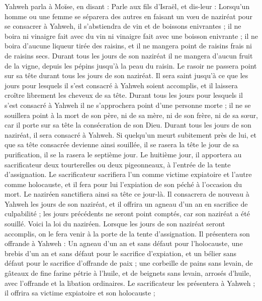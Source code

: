 \begin{multicols}{2}
\VerseOne{}Yahweh parla à Moïse, en disant :
Parle aux fils d'Israël, et dis-leur : Lorsqu’un homme ou une femme se séparera des autres en faisant un vœu de naziréat pour se consacrer à Yahweh,
il s'abstiendra de vin et de boissons enivrantes ; il ne boira ni vinaigre fait avec du vin ni vinaigre fait avec une boisson enivrante ; il ne boira d’aucune liqueur tirée des raisins, et il ne mangera point de raisins frais ni de raisins secs.
Durant tous les jours de son naziréat il ne mangera d'aucun fruit de la vigne, depuis les pépins jusqu'à la peau du raisin.
Le rasoir ne passera point sur sa tête durant tous les jours de son naziréat. Il sera saint jusqu'à ce que les jours pour lesquels il s'est consacré à Yahweh soient accomplis, et il laissera croître librement les cheveux de sa tête.
Durant tous les jours pour lesquels il s'est consacré à Yahweh il ne s'approchera point d’une personne morte ;
il ne se souillera point à la mort de son père, ni de sa mère, ni de son frère, ni de sa sœur, car il porte sur sa tête la consécration de son Dieu.
Durant tous les jours de son naziréat, il sera consacré à Yahweh.
Si quelqu'un meurt subitement près de lui, et que sa tête consacrée devienne ainsi souillée, il se rasera la tête le jour de sa purification, il se la rasera le septième jour.
Le huitième jour, il apportera au sacrificateur deux tourterelles ou deux pigeonneaux, à l'entrée de la tente d'assignation.
Le sacrificateur sacrifiera l’un comme victime expiatoire et l'autre comme holocauste, et il fera pour lui l’expiation de son péché à l'occasion du mort. Le naziréen sanctifiera ainsi sa tête ce jour-là.
Il consacrera de nouveau à Yahweh les jours de son naziréat, et il offrira un agneau d'un an en sacrifice de culpabilité ; les jours précédents ne seront point comptés, car son naziréat a été souillé.
Voici la loi du naziréen. Lorsque les jours de son naziréat seront accomplis, on le fera venir à la porte de la tente d'assignation.
Il présentera son offrande à Yahweh : Un agneau d'un an et sans défaut pour l’holocauste, une brebis d'un an et sans défaut pour le sacrifice d’expiation, et un bélier sans défaut pour le sacrifice d’offrande de paix ;
une corbeille de pains sans levain, de gâteaux de fine farine pétrie à l'huile, et de beignets sans levain, arrosés d'huile, avec l’offrande et la libation ordinaires.
Le sacrificateur les présentera à Yahweh ; il offrira sa victime expiatoire et son holocauste ;

\end{multicols}
